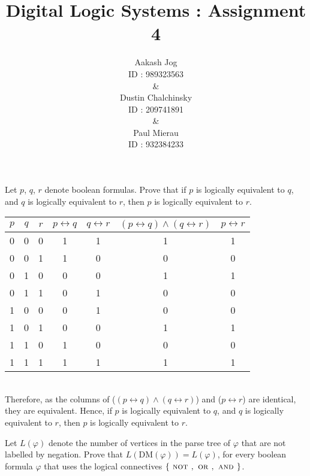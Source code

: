 \documentclass[fleqn, a4paper, 12pt, oneside]{amsart}
\title{Digital Logic Systems : Assignment 4}
\author{
	Aakash Jog\\
	ID : 989323563\\
	\&\\
	Dustin Chalchinsky\\
	ID : 209741891\\
	\&\\
	Paul Mierau\\
	ID : 932384233
	}
\date{\formatdate{21}{4}{2015}}
\theoremstyle{definition}
\theoremstyle{theorem}
\theoremstyle{remark}
\newcommand{\Not}{{\textsc{ not }}}
\renewcommand{\And}{{\textsc{ and }}}
\newcommand{\Or}{{\textsc{ or }}}
\newcommand{\AND}{\wedge}
\newcommand{\logequiv}{\leftrightarrow}
\begin{document}
	
\maketitle

\begin{question}
	Let $p$, $q$, $r$ denote boolean formulas.
	Prove that if $p$ is logically equivalent to $q$, and $q$ is logically equivalent to $r$, then $p$ is logically equivalent to $r$.
\end{question}

\begin{solution}
	\begin{tabular}[c]{|c|c|c||c|c|c|c|}
		\hline
		$p$ & $q$ & $r$ & $p \logequiv q$ & $q \logequiv r$ & $(p \logequiv q) \AND (q \logequiv r)$ & $p \logequiv r$\\
		\hline
		0   & 0   & 0   & 1               & 1               & 1                                      & 1 \\
		0   & 0   & 1   & 1               & 0               & 0                                      & 0 \\
		0   & 1   & 0   & 0               & 0               & 1                                      & 1 \\
		0   & 1   & 1   & 0               & 1               & 0                                      & 0 \\
		1   & 0   & 0   & 0               & 1               & 0                                      & 0 \\
		1   & 0   & 1   & 0               & 0               & 1                                      & 1 \\
		1   & 1   & 0   & 1               & 0               & 0                                      & 0 \\
		1   & 1   & 1   & 1               & 1               & 1                                      & 1 \\
		\hline
	\end{tabular}\\
	Therefore, as the columns of ($(p \logequiv q) \AND (q \logequiv r)$) and ($p \logequiv r$) are identical, they are equivalent.
	Hence, if  $p$ is logically equivalent to $q$, and $q$ is logically equivalent to $r$, then $p$ is logically equivalent to $r$.
\end{solution}

\begin{question}
	Let $L(\varphi)$ denote the number of vertices in the parse tree of $\varphi$ that are not labelled by negation.
	Prove that $L \left( \mathrm{DM}(\varphi) \right) = L(\varphi)$, for every boolean formula $\varphi$ that uses the logical connectives $\{\Not, \Or, \And\}$.	
\end{question}
\end{document}
